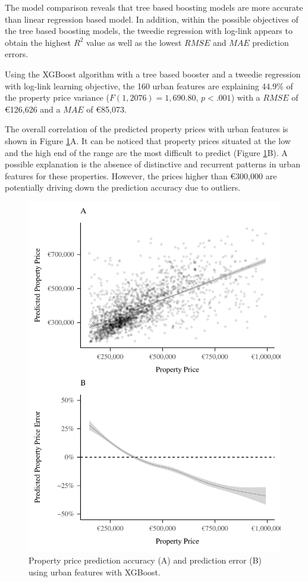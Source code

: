 \documentclass[conference,final,]{IEEEtran}
\begin{document}
The model comparison reveals that tree based boosting models are more accurate than linear regression based model. In addition, within the possible objectives of the tree based boosting models, the tweedie regression with log-link appears to obtain the highest \(R^2\) value as well as the lowest \(RMSE\) and \(MAE\) prediction errors.

Using the XGBoost algorithm with a tree based booster and a tweedie regression with log-link learning objective, the 160 urban features are explaining 44.9\% of the property price variance (\(F(1, 2076) = 1,690.80\), \(p < .001\)) with a \(RMSE\) of €126,626 and a \(MAE\) of €85,073.

The overall correlation of the predicted property prices with urban features is shown in Figure \ref{fig:osm-features-xgb}A. It can be noticed that property prices situated at the low and the high end of the range are the most difficult to predict (Figure \ref{fig:osm-features-xgb}B). A possible explanation is the absence of distinctive and recurrent patterns in urban features for these properties. However, the prices higher than €300,000 are potentially driving down the prediction accuracy due to outliers.

\begin{figure}[!h]
\includegraphics[width=0.98\columnwidth]{manuscript_files/figure-latex/osm-features-xgb-1} \caption{Property price prediction accuracy (A) and prediction error (B) using urban features with XGBoost.}\label{fig:osm-features-xgb}
\end{figure}
\end{document}
